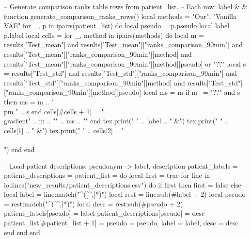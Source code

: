 \begin{luacode*}
        -- Generate comparison ranks table rows from patient_list.
        -- Each row: label &  &  \\
        function generate_comparison_ranks_rows()
        local methods = { "Our", "Vanilla VAE" }
        for _, p in ipairs(patient_list) do
        local pseudo = p.pseudo
        local label = p.label
        local cells = {}
        for _, method in ipairs(methods) do
        local m = results["Test_mean"] and results["Test_mean"]["ranks_comparison_90min"]
        and results["Test_mean"]["ranks_comparison_90min"][method]
        and results["Test_mean"]["ranks_comparison_90min"][method][pseudo] or "??"
        local s = results["Test_std"] and results["Test_std"]["ranks_comparison_90min"]
        and results["Test_std"]["ranks_comparison_90min"][method]
        and results["Test_std"]["ranks_comparison_90min"][method][pseudo]
        local ms = m
        if m ~= "??" and s then ms = m .. " \\pm " .. s end
        cells[#cells + 1] = "\\gradient{" .. m .. "}{" .. ms .. "}"
        end
        tex.print("        " .. label .. " &")
        tex.print("        " .. cells[1] .. " &")
        tex.print("        " .. cells[2] .. " \\\\")
        end
        end

        -- Load patient descriptions: pseudonym -> label, description
        patient_labels = {}
        patient_descriptions = {}
        patient_list = {}
        do
        local first = true
        for line in io.lines("new_results/patient_descriptions.csv") do
        if first then
        first = false
        else
        local label = line:match("^([^,]*)")
        local rest = line:sub(#label + 2)
        local pseudo = rest:match("^([^,]*)")
        local desc = rest:sub(#pseudo + 2)
        patient_labels[pseudo] = label
        patient_descriptions[pseudo] = desc
        patient_list[#patient_list + 1] = { pseudo = pseudo, label = label, desc = desc }
        end
        end
        end


\end{luacode*}
